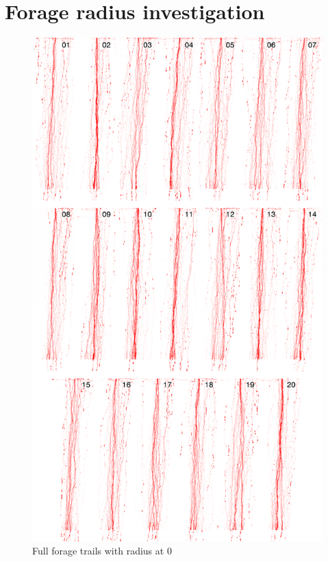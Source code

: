 \section{Forage radius investigation}
\label{ap:exp-2}

\begin{figure}[H]
  \centering
  \includegraphics[width=0.75\linewidth]{gfx/radius-0-final.png}
  \caption{Full forage trails with radius at 0}
  \label{fig:radius-0-final}
\end{figure}

